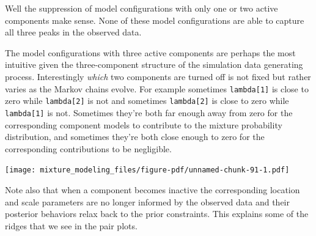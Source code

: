 \documentclass[
  letterpaper,
  DIV=11,
  numbers=noendperiod]{scrartcl}
\newenvironment{Shaded}{\begin{snugshade}}{\end{snugshade}}
\newcommand{\FunctionTok}[1]{\textcolor[rgb]{0.28,0.35,0.67}{#1}}
\newcommand{\NormalTok}[1]{\textcolor[rgb]{0.00,0.23,0.31}{#1}}
\newcommand{\SpecialCharTok}[1]{\textcolor[rgb]{0.37,0.37,0.37}{#1}}
\newcommand{\StringTok}[1]{\textcolor[rgb]{0.13,0.47,0.30}{#1}}
\begin{document}
Well the suppression of model configurations with only one or two active
components make sense. None of these model configurations are able to
capture all three peaks in the observed data.

The model configurations with three active components are perhaps the
most intuitive given the three-component structure of the simulation
data generating process. Interestingly \emph{which} two components are
turned off is not fixed but rather varies as the Markov chains evolve.
For example sometimes \texttt{lambda{[}1{]}} is close to zero while
\texttt{lambda{[}2{]}} is not and sometimes \texttt{lambda{[}2{]}} is
close to zero while \texttt{lambda{[}1{]}} is not. Sometimes they're
both far enough away from zero for the corresponding component models to
contribute to the mixture probability distribution, and sometimes
they're both close enough to zero for the corresponding contributions to
be negligible.

\begin{Shaded}
\end{Shaded}

\texttt{[image: mixture\_modeling\_files/figure-pdf/unnamed-chunk-91-1.pdf]}

Note also that when a component becomes inactive the corresponding
location and scale parameters are no longer informed by the observed
data and their posterior behaviors relax back to the prior constraints.
This explains some of the ridges that we see in the pair plots.
\end{document}

